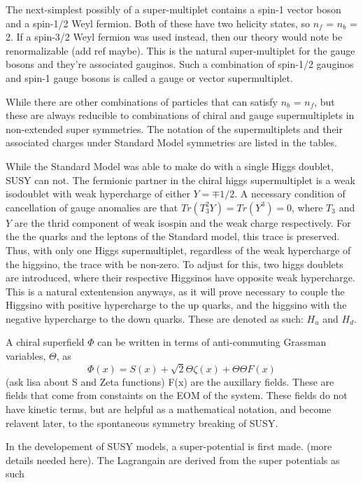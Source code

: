 The next-simplest possibly of a super-multiplet contains a spin-1 vector boson and a spin-1/2 Weyl fermion. Both of these have two helicity states, so $n_f$ = $n_b$ = 2. If a spin-3/2 Weyl fermion was used instead, then our theory would note be renormalizable (add ref maybe). This is the natural super-multiplet for the gauge bosons and they’re associated gauginos. Such a combination of spin-1/2 gauginos and spin-1 gauge bosons is called a gauge or vector supermultiplet. 

While there are other combinations of particles that can satisfy $n_b$ = $n_f$, but these are always reducible to combinations of chiral and gauge supermultiplets in non-extended super symmetries. The notation of the supermultiplets and their associated charges under Standard Model symmetries are listed in the tables. 

While the Standard Model was able to make do with a single Higgs doublet, SUSY can not. The fermionic partner in the chiral higgs supermultiplet is a weak isodoublet with weak hypercharge of either $Y = \mp 1/2$. A necessary condition of cancellation of gauge anomalies are that $Tr(T_3^2Y) = Tr(Y^3) = 0$, where $T_3$ and $Y$ are the thrid component of weak isospin and the weak charge respectively. For the the quarks and the leptons of the Standard model, this trace is preserved. Thus, with only one Higgs supermultiplet, regardless of the weak hypercharge of the higgsino, the trace with be non-zero. To adjust for this, two higgs doublets are introduced, where their respective Higgsinos have opposite weak hypercharge. This is a natural extentension anyways, as it will prove necessary to couple the Higgsino with positive hypercharge to the up quarks, and the higgsino with the negative hypercharge to the down quarks. These are denoted as such: $H_u$ and $H_d$.    

A chiral superfield $\Phi$ can be written in terms of anti-commuting Grassman variables, $\Theta$, as 
\begin{equation*}
    \Phi(x) = S(x) + \sqrt{2}\Theta \zeta(x) + \Theta\Theta F(x)
\end{equation*}
(ask lisa about S and Zeta functions) F(x) are the auxillary fields. These are fields that come from constaints on the EOM of the system. These fields do not have kinetic terms, but are helpful as a mathematical notation, and become relavent later, to the spontaneous symmetry breaking of SUSY.

In the developement of SUSY models, a super-potential is first made. (more details needed here). The Lagrangain are derived from the super potentials as such


